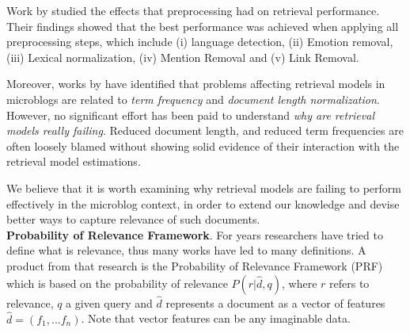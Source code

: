 Work by \cite{thomassearching} studied the effects that preprocessing had on retrieval performance. Their findings showed that the best performance was achieved when applying all preprocessing steps, which include (i) language detection, (ii) Emotion removal, (iii) Lexical normalization, (iv) Mention Removal and (v) Link Removal. 

Moreover, works by \cite{ferguson2012investigation,naveed2011searching} have identified that problems affecting retrieval models in microblogs are related to \textit{term frequency} and \textit{document length normalization}.\\



However, no significant effort has been paid to understand \textit{why are retrieval models really failing}. Reduced document length, and reduced term frequencies are often loosely blamed without showing solid evidence of their interaction with the retrieval model estimations.

We believe that it is worth examining why retrieval models are failing to perform effectively in the microblog context, in order to extend our knowledge and devise better ways to capture relevance of such documents.\\

%
%



\noindent \textbf{Probability of Relevance Framework}. For years researchers have tried to define what is relevance, thus many works have led to many definitions. A product from that research is the Probability of Relevance Framework (PRF) \cite{roelleke2013information} which is based on the probability of relevance \(P(r|\hat{d},q)\), where \(r\) refers to relevance, \(q\) a given query and \(\hat{d}\) represents a document as a vector of features \(\hat{d} = (f_1,...f_n)\). Note that vector features can be any imaginable data.\\

